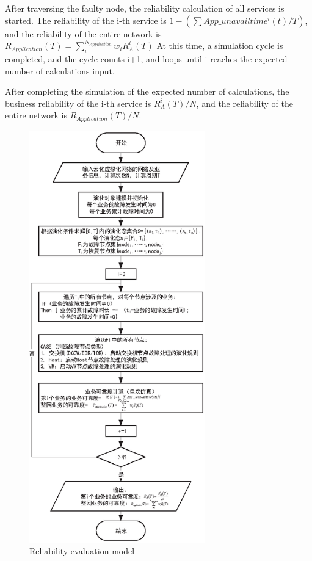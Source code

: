 \documentclass[journal]{IEEEtran}
\begin{document}
    After traversing the faulty node, the reliability calculation of all services is started. The reliability of the i-th service is $1-(\sum App\_unavailtime^i(t)/T)$, and the reliability of the entire network is $R_{Application}(T)=\sum_i^{N_{Application}}w_iR_A ^i(T)$ At this time, a simulation cycle is completed, and the cycle counts i+1, and loops until i reaches the expected number of calculations input.

    After completing the simulation of the expected number of calculations, the business reliability of the i-th service is $R_A^i(T)/N$, and the reliability of the entire network is $R_{Application}(T)/N$.

    \begin{figure}[!t]
        \begin{center}
            \includegraphics[width = 3in]{img/9.eps}
            \caption{Reliability evaluation model}
            \label{fig9}
        \end{center}
    \end{figure}
\end{document}
